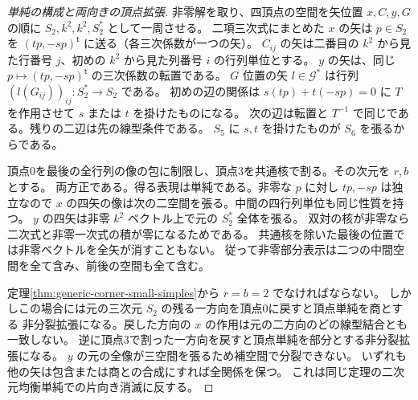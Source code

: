 \begin{proof}[単純の構成と両向きの頂点拡張]
非零解を取り、四頂点の空間を矢位置 $x,C,y,G$ の順に
$S_2,k^2,k^2,S_2^*$ として一周させる。
二項三次式にまとめた $x$ の矢は $p\in S_2$ を
$(t p,-s p)^{\mathsf t}$ に送る（各三次係数が一つの矢）。
$C_{ij}$ の矢は二番目の $k^2$ から見た行番号 $j$、初めの $k^2$ から見た列番号 $i$ の行列単位とする。
$y$ の矢は、同じ $p\mapsto(t p,-s p)^{\mathsf t}$ の三次係数の転置である。
$G$ 位置の矢 $l\in\mathcal G^*$ は行列 $(l(G_{ij}))_{ij}:S_2^*\to S_2$ である。
初めの辺の関係は $s(tp)+t(-sp)=0$ に $T$ を作用させて $s$ または $t$ を掛けたものになる。
次の辺は転置と $T^{-1}$ で同じである。残りの二辺は先の線型条件である。
$S_5$ に $s,t$ を掛けたものが $S_6$ を張るからである。

頂点0を最後の全行列の像の包に制限し、頂点3を共通核で割る。その次元を $r,b$ とする。
両方正である。得る表現は単純である。非零な $p$ に対し $tp,-sp$ は独立なので
$x$ の四矢の像は次の二空間を張る。中間の四行列単位も同じ性質を持つ。
$y$ の四矢は非零 $k^2$ ベクトル上で元の $S_2^*$ 全体を張る。
双対の核が非零なら二次式と非零一次式の積が零になるためである。
共通核を除いた最後の位置では非零ベクトルを全矢が消すこともない。
従って非零部分表示は二つの中間空間を全て含み、前後の空間も全て含む。

定理\ref{thm:generic-corner-small-simples}から $r=b=2$ でなければならない。
しかしこの場合には元の三次元 $S_2$ の残る一方向を頂点0に戻すと頂点単純を商とする
非分裂拡張になる。戻した方向の $x$ の作用は元の二方向のどの線型結合とも一致しない。
逆に頂点3で割った一方向を戻すと頂点単純を部分とする非分裂拡張になる。
$y$ の元の全像が三空間を張るため補空間で分裂できない。
いずれも他の矢は包含または商との合成にすれば全関係を保つ。
これは同じ定理の二次元均衡単純での片向き消滅に反する。
\end{proof}

